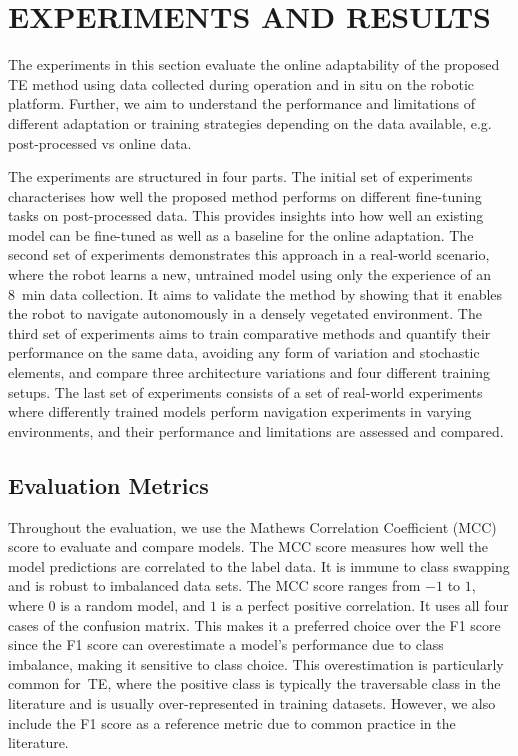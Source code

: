 \section{EXPERIMENTS AND RESULTS}
\label{sec:experiments}
The experiments in this section evaluate the online adaptability of the proposed TE method using data collected during operation and in situ on the robotic platform. Further, we aim to understand the performance and limitations of different adaptation or training strategies depending on the data available, e.g. post-processed vs online data. 

The experiments are structured in four parts. The initial set of experiments characterises how well the proposed method performs on different fine-tuning tasks on post-processed data. This provides insights into how well an existing model can be fine-tuned as well as a baseline for the online adaptation.
%
The second set of experiments demonstrates this approach in a real-world scenario, where the robot learns a new, untrained model using only the experience of an \qty{8}{\minute} data collection. It aims to validate the method by showing that it enables the robot to navigate autonomously in a densely vegetated environment.
% 
The third set of experiments aims to train comparative methods and quantify their performance on the same data, avoiding any form of variation and stochastic elements, and compare three architecture variations and four different training setups.
%
The last set of experiments consists of a set of real-world experiments where differently trained models perform navigation experiments in varying environments, and their performance and limitations are assessed and compared. 

\subsection{Evaluation Metrics}
Throughout the evaluation, we use the Mathews Correlation Coefficient (MCC) score to evaluate and compare models. The MCC score measures how well the model predictions are correlated to the label data. It is immune to class swapping and is robust to imbalanced data sets. The MCC score ranges from $ -1$ to $1$, where 0 is a random model, and $1$ is a perfect positive correlation. It uses all four cases of the confusion matrix.  This makes it a preferred choice over the F1 score since the F1 score can overestimate a model's performance due to class imbalance, making it sensitive to class choice. This overestimation is particularly common for~\ac{TE}, where the positive class is typically the traversable class in the literature and is usually over-represented in training datasets. However, we also include the F1 score as a reference metric due to common practice in the literature.

